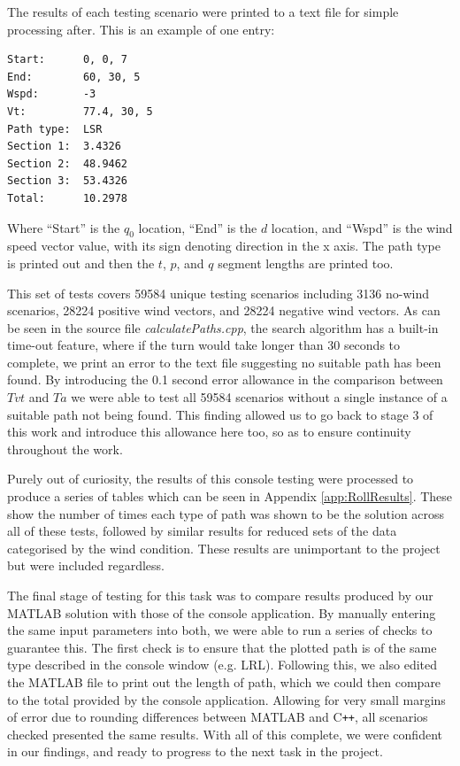 The results of each testing scenario were printed to a text file for simple processing after. This is an example of one entry:

\begin{minipage}{\linewidth}
\begin{lstlisting}[language={}]
Start: 		0, 0, 7
End: 		60, 30, 5
Wspd: 		-3
Vt:  		77.4, 30, 5
Path type: 	LSR
Section 1: 	3.4326
Section 2: 	48.9462
Section 3: 	53.4326
Total: 		10.2978
\end{lstlisting}
\end{minipage}

Where ``Start'' is the $q_0$ location, ``End'' is the $d$ location, and ``Wspd'' is the wind speed vector value, with its sign denoting direction in the x axis. The path type is printed out and then the $t$, $p$, and $q$ segment lengths are printed too. 

This set of tests covers 59584 unique testing scenarios including 3136 no-wind scenarios, 28224 positive wind vectors, and 28224 negative wind vectors. As can be seen in the source file \textit{calculatePaths.cpp}, the search algorithm has a built-in time-out feature, where if the turn would take longer than 30 seconds to complete, we print an error to the text file suggesting no suitable path has been found. By introducing the 0.1 second error allowance in the comparison between $Tvt$ and $Ta$ we were able to test all 59584 scenarios without a single instance of a suitable path not being found. This finding allowed us to go back to stage 3 of this work and introduce this allowance here too, so as to ensure continuity throughout the work. 

Purely out of curiosity, the results of this console testing were processed to produce a series of tables which can be seen in Appendix \ref{app:RollResults}. These show the number of times each type of path was shown to be the solution across all of these tests, followed by similar results for reduced sets of the data categorised by the wind condition. These results are unimportant to the project but were included regardless.

The final stage of testing for this task was to compare results produced by our MATLAB solution with those of the console application. By manually entering the same input parameters into both, we were able to run a series of checks to guarantee this. The first check is to ensure that the plotted path is of the same type described in the console window (e.g. LRL). Following this, we also edited the MATLAB file to print out the length of path, which we could then compare to the total provided by the console application. Allowing for very small margins of error due to rounding differences between MATLAB and C\texttt{++}, all scenarios checked presented the same results. With all of this complete, we were confident in our findings, and ready to progress to the next task in the project.

